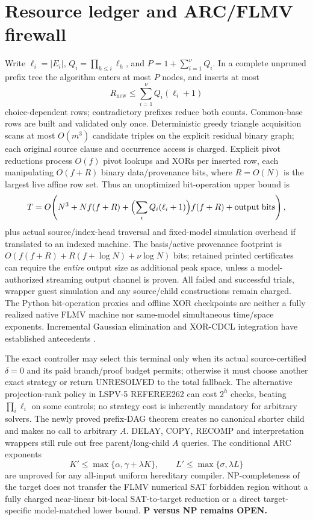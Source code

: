 \documentclass[11pt]{article}
\begin{document}
\section{Resource ledger and ARC/FLMV firewall}
Write $\ell_i=|E_i|$, $Q_i=\prod_{h\le i}\ell_h$, and $P=1+\sum_{i=1}^\nu Q_i$. In a complete unpruned prefix tree the algorithm enters at most $P$ nodes, and inserts at most
\[
 R_\mathrm{new}\le \sum_{i=1}^\nu Q_i(\ell_i+1)
\]
choice-dependent rows; contradictory prefixes reduce both counts. Common-base rows are built and validated only once. Deterministic greedy triangle acquisition scans at most $O(m^3)$ candidate triples on the explicit residual binary graph; each original source clause and occurrence access is charged. Explicit pivot reductions process $O(f)$ pivot lookups and XORs per inserted row, each manipulating $O(f+R)$ binary data/provenance bits, where $R=O(N)$ is the largest live affine row set. Thus an unoptimized bit-operation upper bound is
\[
 T=O\!\left(N^3+Nf(f+R)+\Bigl(\sum_iQ_i(\ell_i+1)\Bigr)f(f+R)+\mathrm{output\;bits}\right),
\]
plus actual source/index-head traversal and fixed-model simulation overhead if translated to an indexed machine. The basis/active provenance footprint is $O(f(f+R)+R(f+\log N)+\nu\log N)$ bits; retained printed certificates can require the \emph{entire} output size as additional peak space, unless a model-authorized streaming output channel is proven. All failed and successful trials, wrapper guest simulation and any source/child constructions remain charged. The Python bit-operation proxies and offline XOR checkpoints are neither a fully realized native FLMV machine nor same-model simultaneous time/space exponents. Incremental Gaussian elimination and XOR-CDCL integration have established antecedents \cite{laitinen2012,soos2012}.

The exact controller may select this terminal only when its actual source-certified $\delta=0$ and its paid branch/proof budget permits; otherwise it must choose another exact strategy or return UNRESOLVED to the total fallback. The alternative projection-rank policy in LSPV-5 REFEREE262 can cost $2^h$ checks, beating $\prod_i\ell_i$ on some controls; no strategy cost is inherently mandatory for arbitrary solvers. The newly proved prefix-DAG theorem creates no canonical shorter child and makes no call to arbitrary $A$. DELAY, COPY, RECOMP and interpretation wrappers still rule out free parent/long-child $A$ queries. The conditional ARC exponents
\[
 K'\le\max\{\alpha,\gamma+\lambda K\},\qquad L'\le\max\{\sigma,\lambda L\}
\]
are unproved for any all-input uniform hereditary compiler. NP-completeness of the target does not transfer the FLMV numerical SAT forbidden region without a fully charged near-linear bit-local SAT-to-target reduction or a direct target-specific model-matched lower bound. \textbf{P versus NP remains OPEN.}
\end{document}
